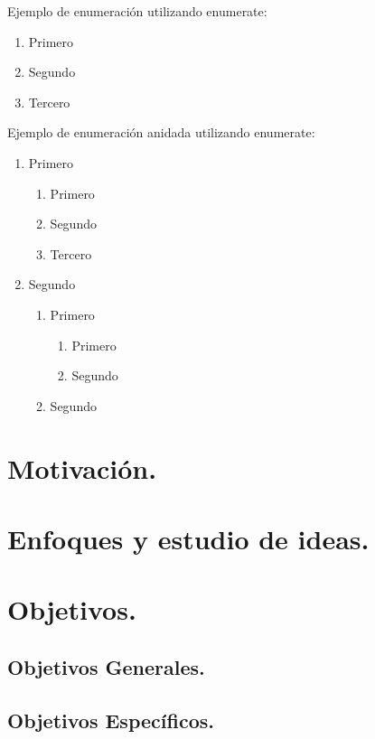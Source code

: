 \documentclass[12pt,a4paper,oneside]{book}
\begin{document}
Ejemplo de enumeración utilizando enumerate:
\begin{enumerate}
    \item Primero
    \item Segundo
    \item Tercero\\
\end{enumerate}

Ejemplo de enumeración anidada utilizando enumerate:
\begin{enumerate}
    \item Primero 
        \begin{enumerate}
        \item Primero
        \item Segundo
        \item Tercero
        \end{enumerate}
    \item Segundo
        \begin{enumerate}
        \item Primero
            \begin{enumerate}
            \item Primero
            \item Segundo
            \end{enumerate}
        \item Segundo
        \end{enumerate}
\end{enumerate}

\section{Motivación.}
\label{motivacion}

\section{Enfoques y estudio de ideas.}
\label{enfoques}

\section{Objetivos.}
\label{objetivos}

\subsection{Objetivos Generales.}
\label{objetivosgenerales}

\subsection{Objetivos Específicos.}
\label{objetivosespecificos}
\end{document}
